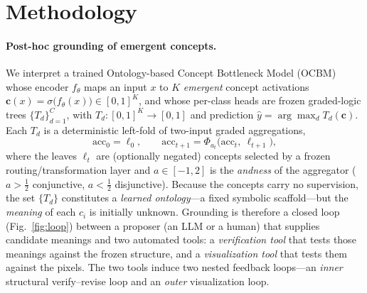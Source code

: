 \section{Methodology}
\label{sec:method}

\paragraph{Post-hoc grounding of emergent concepts.}
We interpret a trained Ontology-based Concept Bottleneck Model (OCBM) whose
encoder $f_\theta$ maps an input $x$ to $K$ \emph{emergent} concept activations
$\mathbf{c}(x)=\sigma\!\big(f_\theta(x)\big)\in[0,1]^K$, and whose per-class heads
are frozen graded-logic trees $\{T_d\}_{d=1}^{C}$, with
$T_d:[0,1]^K\!\to[0,1]$ and prediction $\hat y=\arg\max_d T_d(\mathbf{c})$.
Each $T_d$ is a deterministic left-fold of two-input graded aggregations,
\begin{equation}
\mathrm{acc}_{0}=\ell_0,\qquad
\mathrm{acc}_{t+1}=\Phi_{a_t}\!\big(\mathrm{acc}_t,\ \ell_{t+1}\big),
\end{equation}
where the leaves $\ell_t$ are (optionally negated) concepts selected by a frozen
routing/transformation layer and $a\in[-1,2]$ is the \emph{andness} of the
aggregator ($a>\tfrac12$ conjunctive, $a<\tfrac12$ disjunctive). Because the
concepts carry no supervision, the set $\{T_d\}$ constitutes a \emph{learned
ontology}---a fixed symbolic scaffold---but the \emph{meaning} of each $c_i$ is
initially unknown. Grounding is therefore a closed loop
(Fig.~\ref{fig:loop}) between a proposer (an LLM or a human) that supplies
candidate meanings and two automated tools: a \emph{verification tool} that tests
those meanings against the frozen structure, and a \emph{visualization tool} that
tests them against the pixels. The two tools induce two nested feedback loops---an
\emph{inner} structural verify--revise loop and an \emph{outer} visualization loop.

